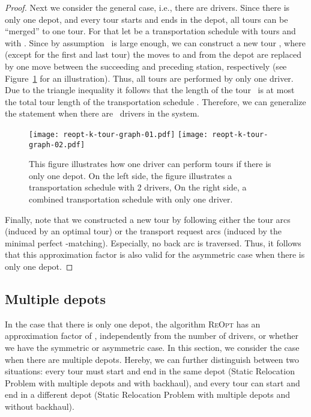 \documentclass[english]{llncs}
\numberwithin{sublemma}{lemma}
\newcommand{\REOPT}{\textsc{ReOpt}\xspace}
\begin{document}
\begin{proof}
Next we consider the general case, i.e., there are  drivers.
Since there is only one depot, and every tour starts and ends in the depot, all tours can be ``merged'' to one tour.
For that let  be a transportation schedule with  tours and with .
Since by assumption~ is large enough, we can construct a new tour ,
where (except for the first and last tour) the moves to and from the depot are replaced by one move between
the succeeding and preceding station, respectively (see Figure~\ref{fig: static: reopt: k tour one driver} for an illustration).
Thus, all  tours are performed by only one driver.
Due to the triangle inequality it follows that the length of the tour~ is at most the total tour length of the transportation schedule .
Therefore, we can generalize the statement when there are~ drivers in the system.

\begin{figure}[ht]
    \centering
    \texttt{[image: reopt-k-tour-graph-01.pdf]}
    \texttt{[image: reopt-k-tour-graph-02.pdf]}
 \caption{
  This figure illustrates how one driver can perform  tours if there is only one depot.
  On the left side, the figure illustrates a transportation schedule with 2 drivers,
  On the right side, a combined transportation schedule with only one driver.
 }
 \label{fig: static: reopt: k tour one driver}
\end{figure}




Finally, note that we constructed a new tour by following either the tour arcs (induced by an optimal tour) or the transport request arcs (induced by the minimal perfect -matching).
Especially, no back arc is traversed.
Thus, it follows that this approximation factor is also valid for the asymmetric case when there is only one depot.
\end{proof}



\subsection{Multiple depots}\label{sec: static: reopt: multiple depot}

In the case that there is only one depot, the algorithm \REOPT has an approximation factor of , independently from the number of drivers,
or whether we have the symmetric or asymmetric case.
In this section, we consider the case when there are multiple depots.
Hereby, we can further distinguish between two situations: every tour must start and end in the same depot (Static Relocation Problem with multiple depots and with backhaul),
and every tour can start and end in a different depot (Static Relocation Problem with multiple depots and without backhaul).
\end{document}
